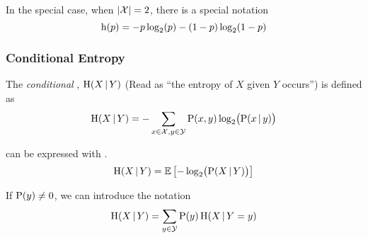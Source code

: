 \begin{definition}\label{def:Entropy_Binary_Discrete_Random_Variable}
  In the special case, when $\lvert \mathcal{X} \rvert = 2$, there is a special notation
  \begin{equation}\label{eq:24}
    \operatorname{\operatorname{h}}(p) = -p \log_{2} (p) - (1-p) \log_{2} (1-p)
  \end{equation}
\end{definition}

\subsubsection{Conditional Entropy}\label{subsubsec:Conditional_Entropy}
\begin{definition}\label{def:Conditional_Entropy}
  The \emph{conditional }, $\operatorname{\operatorname{H}}(X \operatorname{\vert} Y)$ (Read as ``the entropy of $X$ given $Y$ occurs'') is defined as
  \begin{equation}\label{eq:Conditional_Entropy}
    \operatorname{\operatorname{H}}(X \operatorname{\vert} Y) = - \sum\limits_{x \in \mathcal{X}, y \in \mathcal{Y}} \operatorname{\operatorname{P}}(x, y) \log_{2} \bigl( \operatorname{\operatorname{P}}(x \operatorname{\vert} y) \bigr)
  \end{equation}

   can be expressed with .
  \begin{equation}\label{eq:Conditional_Entropy-Expected_Value}
    \operatorname{\operatorname{H}}(X \operatorname{\vert} Y) = \operatorname{\operatorname{\mathbb{E}}} \left[ -\log_{2} \bigl( \operatorname{\operatorname{P}}(X \operatorname{\vert} Y) \bigr) \right]
  \end{equation}

  If $\operatorname{\operatorname{P}}(y) \neq 0$, we can introduce the notation
  \begin{equation}\label{eq:Conditional_Entropy-Nonzero_Given}
    \operatorname{\operatorname{H}}(X \operatorname{\vert} Y) = \sum\limits_{y \in \mathcal{Y}} \operatorname{\operatorname{P}}(y) \operatorname{\operatorname{H}}(X \operatorname{\vert} Y=y)
  \end{equation}
\end{definition}


